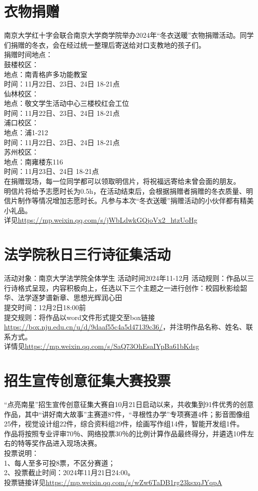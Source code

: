 \documentclass[letterpaper, 12pt]{article}
\begin{document}
\begin{multicols}{2}
\section{衣物捐赠}
南京大学红十字会联合南京大学商学院举办2024年“冬衣送暖”衣物捐赠活动。同学们捐赠的冬衣，会在经过统一整理后寄送给对口支教地的孩子们。\\
捐赠时间地点：\\
鼓楼校区：\\
地点：南青格庐多功能教室\\
时间：11月22日、23日、24日 18-21点\\
仙林校区：\\
地点：敬文学生活动中心三楼校红会工位\\
时间：11月22日、23日、24日 18-21点\\
浦口校区：\\
地点：浦1-212\\
时间：11月22日、23日、24日 18-21点\\
苏州校区：\\
地点：南雍楼东116\\
时间：11月23日、24日 18-21点\\
在捐赠现场，每一位同学都可以领取明信片，将祝福远寄给未曾会面的朋友。\\
明信片将给予志愿时长为0.5h，在活动结束后，会根据捐赠者捐赠的冬衣质量、明信片制作等情况增加志愿时长。凡参与本次“冬衣送暖”捐赠活动的小伙伴都有精美小礼品。\\
详见\url{https://mp.weixin.qq.com/s/jWbLdwkGQjoVx2_htzUoHg}


\section{法学院秋日三行诗征集活动}
活动对象：南京大学法学院全体学生
活动时间2024年11-12月
活动规则：作品以三行诗格式呈现，内容积极向上，任选以下三个主题之一进行创作：校园秋影绘韶华、法学逐梦谱新章、思想光辉润心田\\
提交时间：12月2日18:00前\\
提交规则：将作品以word文件形式提交至box链接\url{https://box.nju.edu.cn/u/d/9daaf55c4a5d47139c36/}，并注明作品名称、姓名、联系方式。\\
详情见\url{https://mp.weixin.qq.com/s/SaQ73OhEsaIYpBa61bKdsg}
\section{招生宣传创意征集大赛投票}
“点亮南星”招生宣传创意征集大赛自10月21日启动以来，共收集到91件优秀的创意作品，其中“讲好南大故事”主赛道87件，“寻根性办学”专项赛道4件；影音图像组25件，视觉设计组22件，综合资料组29件，绘画写作组14件，智能开发组1件。\\
作品将按照专业评审70％、网络投票30％的比例计算作品最终得分，并遴选10件左右的特等奖作品进入现场决赛。\\
投票说明：\\
1、每人至多可投8票，不区分赛道；\\
2、投票截止时间：2024年11月21日24:00。\\
投票链接详见\url{https://mp.weixin.qq.com/s/wZw6TaDB1rg23ksxqJYqpA}


\end{multicols}
\end{document}
